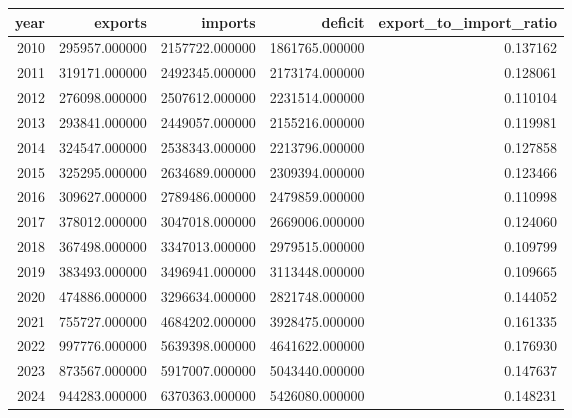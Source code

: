 \begin{tabular}{rrrrr}
\toprule
year & exports & imports & deficit & export_to_import_ratio \\
\midrule
2010 & 295957.000000 & 2157722.000000 & 1861765.000000 & 0.137162 \\
2011 & 319171.000000 & 2492345.000000 & 2173174.000000 & 0.128061 \\
2012 & 276098.000000 & 2507612.000000 & 2231514.000000 & 0.110104 \\
2013 & 293841.000000 & 2449057.000000 & 2155216.000000 & 0.119981 \\
2014 & 324547.000000 & 2538343.000000 & 2213796.000000 & 0.127858 \\
2015 & 325295.000000 & 2634689.000000 & 2309394.000000 & 0.123466 \\
2016 & 309627.000000 & 2789486.000000 & 2479859.000000 & 0.110998 \\
2017 & 378012.000000 & 3047018.000000 & 2669006.000000 & 0.124060 \\
2018 & 367498.000000 & 3347013.000000 & 2979515.000000 & 0.109799 \\
2019 & 383493.000000 & 3496941.000000 & 3113448.000000 & 0.109665 \\
2020 & 474886.000000 & 3296634.000000 & 2821748.000000 & 0.144052 \\
2021 & 755727.000000 & 4684202.000000 & 3928475.000000 & 0.161335 \\
2022 & 997776.000000 & 5639398.000000 & 4641622.000000 & 0.176930 \\
2023 & 873567.000000 & 5917007.000000 & 5043440.000000 & 0.147637 \\
2024 & 944283.000000 & 6370363.000000 & 5426080.000000 & 0.148231 \\
\bottomrule
\end{tabular}
